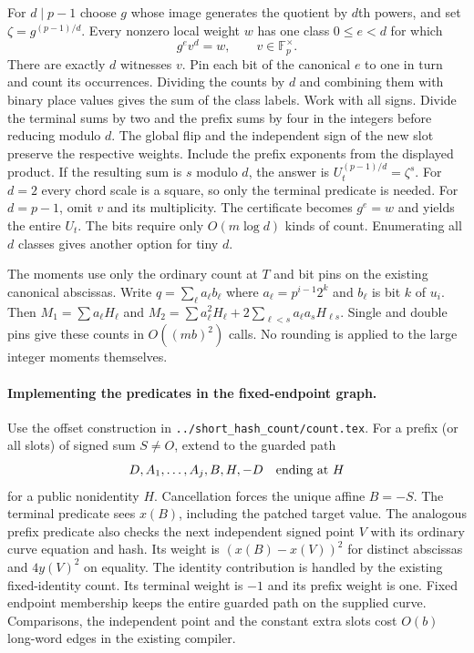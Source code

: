 \documentclass[11pt]{article}
\newcommand{\F}{\mathbb F}
\begin{document}
For $d\mid p-1$ choose $g$ whose image generates the quotient by
$d$th powers, and set $\zeta=g^{(p-1)/d}$. Every nonzero local
weight $w$ has one class $0\le e<d$ for which
\[
                     g^e v^d=w,\qquad v\in\F_p^\times .
\]
There are exactly $d$ witnesses $v$. Pin each bit of the canonical
$e$ to one in turn and count its occurrences. Dividing the
counts by $d$ and combining them with binary place values gives
the sum of the class labels. Work with all signs. Divide the
terminal sums by two and the prefix sums by four in the integers
before reducing modulo $d$. The global flip and the independent
sign of the new slot preserve the respective weights. Include the
prefix exponents from the displayed product. If the resulting sum
is $s$ modulo $d$, the answer is $U_t^{(p-1)/d}=\zeta^s$.
For $d=2$ every chord scale is a square, so only the terminal
predicate is needed. For $d=p-1$, omit $v$ and its multiplicity.
The certificate becomes $g^e=w$ and yields the entire $U_t$.
The bits require only $O(m\log d)$ kinds of count. Enumerating all
$d$ classes gives another option for tiny $d$.

The moments use only the ordinary count at $T$ and bit pins on the
existing canonical abscissas. Write $q=\sum_\ell a_\ell b_\ell$
where $a_\ell=p^{i-1}2^k$ and $b_\ell$ is bit $k$ of $u_i$.
Then $M_1=\sum a_\ell H_\ell$ and
$M_2=\sum a_\ell^2H_\ell+
2\sum_{\ell<s}a_\ell a_s H_{\ell s}$. Single and double pins
give these counts in $O((mb)^2)$ calls. No rounding is applied
to the large integer moments themselves.

\paragraph{Implementing the predicates in the fixed-endpoint graph.}
Use the offset construction in \texttt{../short\_hash\_count/count.tex}.
For a prefix (or all slots) of signed sum $S\ne O$, extend to
the guarded path
\[
                D,A_1,\ldots,A_j,B,H,-D\quad\hbox{ending at }H
\]
for a public nonidentity $H$. Cancellation forces the unique
affine $B=-S$. The terminal predicate sees $x(B)$, including
the patched target value. The analogous prefix predicate also
checks the next independent signed point $V$ with its ordinary
curve equation and hash. Its weight is $(x(B)-x(V))^2$ for
distinct abscissas and $4y(V)^2$ on equality. The identity
contribution is handled by the existing fixed-identity count. Its
terminal weight is $-1$ and its prefix weight is one. Fixed
endpoint membership keeps the entire guarded path on the supplied
curve. Comparisons, the independent point and the constant extra
slots cost $O(b)$ long-word edges in the existing compiler.
\end{document}
